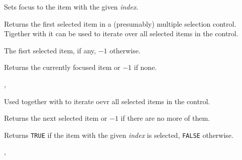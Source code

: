 \label{wxlistviewfocus}


Sets focus to the item with the given {\it index}.


\label{wxlistviewgetfirstselected}


Returns the first selected item in a (presumably) multiple selection control.
Tigether with  it can be
used to iterate over all selected items in the control.


The fisrt selected item, if any, $-1$ otherwise.


\label{wxlistviewgetfocuseditem}


Returns the currently focused item or $-1$ if none.


,\\


\label{wxlistviewgetnextselected}


Used together with  to
iterate oevr all selected items in the control.


Returns the next selected item or $-1$ if there are no more of them.


\label{wxlistviewisselected}


Returns {\tt TRUE} if the item with the given {\it index} is selected, 
{\tt FALSE} otherwise.


,\\


\label{wxlistviewselect}

